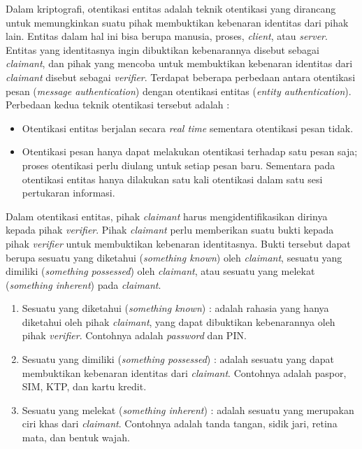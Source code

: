 \documentclass[a4paper,twoside]{article}
\begin{document}
\begin{enumerate}
\begin{itemize}
Dalam kriptografi, otentikasi entitas adalah teknik otentikasi yang dirancang untuk memungkinkan suatu pihak membuktikan kebenaran identitas dari pihak lain. Entitas dalam hal ini bisa berupa manusia, proses, \textit{client}, atau \textit{server}. Entitas yang identitasnya ingin dibuktikan kebenarannya disebut sebagai \textit{claimant}, dan pihak yang mencoba untuk membuktikan kebenaran identitas dari \textit{claimant} disebut sebagai \textit{verifier}. Terdapat beberapa perbedaan antara otentikasi pesan (\textit{message authentication}) dengan otentikasi entitas (\textit{entity authentication}). Perbedaan kedua teknik otentikasi tersebut adalah :
	\begin{itemize}
	\item Otentikasi entitas berjalan secara \textit{real time} sementara otentikasi pesan tidak.
	\item Otentikasi pesan hanya dapat melakukan otentikasi terhadap satu pesan saja; proses otentikasi perlu diulang untuk setiap pesan baru. Sementara pada otentikasi entitas hanya dilakukan satu kali otentikasi dalam satu sesi pertukaran informasi. 
	\end{itemize}
	
Dalam otentikasi entitas, pihak \textit{claimant} harus mengidentifikasikan dirinya kepada pihak \textit{verifier}. Pihak \textit{claimant} perlu memberikan suatu bukti kepada pihak \textit{verifier} untuk membuktikan kebenaran identitasnya. Bukti tersebut dapat berupa sesuatu yang diketahui (\textit{something known}) oleh \textit{claimant}, sesuatu yang dimiliki (\textit{something possessed}) oleh \textit{claimant}, atau sesuatu yang melekat (\textit{something inherent}) pada \textit{claimant}.
\begin{enumerate}
	\item Sesuatu yang diketahui (\textit{something known}) : adalah rahasia yang hanya diketahui oleh pihak \textit{claimant}, yang dapat dibuktikan kebenarannya oleh pihak \textit{verifier}. Contohnya adalah \textit{password} dan PIN.
	\item Sesuatu yang dimiliki (\textit{something possessed}) : adalah sesuatu yang dapat membuktikan kebenaran identitas dari \textit{claimant}. Contohnya adalah paspor, SIM, KTP, dan kartu kredit.
	\item Sesuatu yang melekat (\textit{something inherent}) : adalah sesuatu yang merupakan ciri khas dari \textit{claimant}. Contohnya adalah tanda tangan, sidik jari, retina mata, dan bentuk wajah. \\
\end{enumerate}


\end{itemize}
\end{enumerate}
\end{document}
